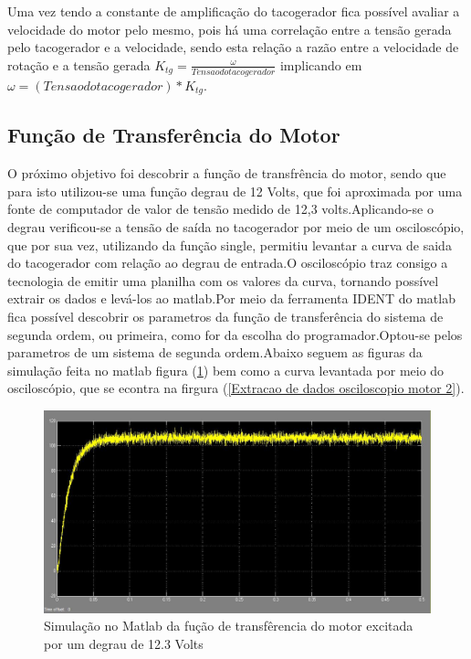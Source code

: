 \documentclass[11pt, a4paper, oneside]{article}
\begin{document}
Uma vez tendo a constante de amplificação do tacogerador fica possível avaliar a velocidade do motor pelo mesmo, pois há uma correlação entre a tensão gerada pelo tacogerador e a velocidade, sendo esta relação a razão entre a velocidade de rotação e a tensão gerada $K_{tg}=\frac{\omega}{Tensao do tacogerador}$ implicando em $\omega=(Tensao do tacogerador)*K_{tg}$.

\subsection{Função de Transferência do Motor}
O próximo objetivo foi descobrir a função de transfrência do motor, sendo que para isto utilizou-se uma função degrau de 12 Volts, que foi aproximada por uma fonte de computador de valor de tensão medido de 12,3 volts.Aplicando-se o degrau verificou-se a tensão de saída no tacogerador por meio de um osciloscópio, que por sua vez, utilizando da função single, permitiu levantar a curva de saida do tacogerador com relação ao degrau de entrada.O osciloscópio traz consigo a tecnologia de emitir uma planilha com os valores da curva, tornando possível extrair os dados e levá-los ao matlab.Por meio da  ferramenta IDENT do matlab fica possível descobrir os parametros da função de transferência do sistema de segunda ordem, ou primeira, como for da escolha do programador.Optou-se pelos parametros de um sistema de segunda ordem.Abaixo seguem as figuras da simulação feita no matlab figura (\ref{Simulcao matlab motor 1}) bem como a curva levantada por meio do osciloscópio, que se econtra na firgura (\ref{Extracao de dados osciloscopio motor 2}).

\begin{figure}[h!]
\centering
\includegraphics[width=.9\linewidth]{Simulacao_motor_excitado_por_degrau.jpg}
\caption{Simulação no Matlab da fução de transfêrencia do motor excitada por um degrau de 12.3 Volts}
\label{Simulcao matlab motor 1}
\end{figure}
\end{document}
